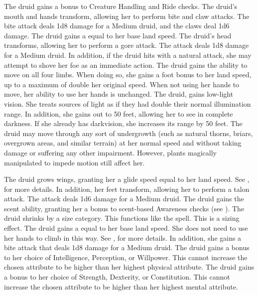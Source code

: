    The druid gains a  bonus to Creature Handling and Ride checks.
    The druid's mouth and hands transform, allowing her to perform bite and claw attacks.
    The bite attack deals 1d8 damage for a Medium druid, and the claws deal 1d6 damage.
    The druid gains a  equal to her base land speed.
    The druid's head transforms, allowing her to perform a gore attack.
    The attack deals 1d8 damage for a Medium druid.
    In addition, if the druid hits with a natural attack, she may attempt to shove her foe as an immediate action.
    The druid gains the ability to move on all four limbs.
    When doing so, she gains a  foot bonus to her land speed, up to a maximum of double her original speed.
    When not using her hands to move, her ability to use her hands is unchanged.
    The druid, gains low-light vision.
    She treats sources of light as if they had double their normal illumination range.
    In addition, she gains  out to 50 feet, allowing her to see in complete darkness.
    If she already has darkvision, she increases its range by 50 feet.
    The druid may move through any sort of undergrowth (such as natural thorns, briars, overgrown areas, and similar terrain) at her normal speed and without taking damage or suffering any other impairment.
    However, plants magically manipulated to impede motion still affect her.

    The druid grows wings, granting her a glide speed equal to her land speed.
    See , for more details.
    In addition, her feet transform, allowing her to perform a talon attack.
    The attack deals 1d6 damage for a Medium druid.
    The druid gains the scent ability, granting her a  bonus to scent-based Awareness checks (see ).
    The druid shrinks by a size category.
    This functions like the  spell.
    This is a sizing effect.
    The druid gains a  equal to her base land speed.
    She does not need to use her hands to climb in this way.
    See , for more details.
    In addition, she gains a bite attack that deals 1d8 damage for a Medium druid.
    The druid gains a  bonus to her choice of Intelligence, Perception, or Willpower.
    This cannot increase the chosen attribute to be higher than her highest physical attribute.
    The druid gains a  bonus to her choice of Strength, Dexterity, or Constitution.
    This cannot increase the chosen attribute to be higher than her highest mental attribute.

